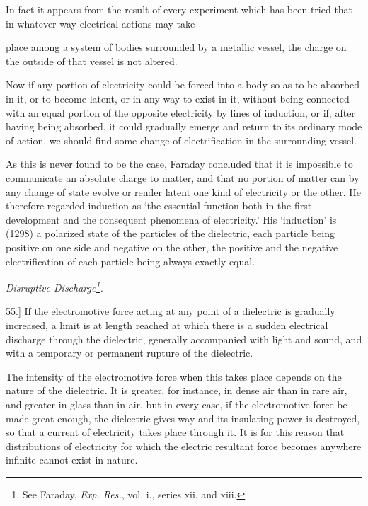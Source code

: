\documentclass[11pt,a4paper]{article}
\begin{document}
In fact it appears from the result of every experiment which
has been tried that in whatever way electrical actions may take

\clearpage
\setcounter{footnote}{0}

place among a system of bodies surrounded by a metallic vessel, the
charge on the outside of that vessel is not altered.

Now if any portion of electricity could be forced into a body
so as to be absorbed in it, or to become latent, or in any way
to exist in it, without being connected with an equal portion of
the opposite electricity by lines of induction, or if, after having
being absorbed, it could gradually emerge and return to its
ordinary mode of action, we should find some change of electrification
in the surrounding vessel.

As this is never found to be the case, Faraday concluded that
it is impossible to communicate an absolute charge to matter, and
that no portion of matter can by any change of state evolve or
render latent one kind of electricity or the other. He therefore
regarded induction as `the essential function both in the first
development and the consequent phenomena of electricity.' His
`induction' is (1298) a polarized state of the particles of the
dielectric, each particle being positive on one side and negative
on the other, the positive and the negative electrification of each
particle being always exactly equal.

\begin{center}
\textit{Disruptive Discharge\footnote{See Faraday, \textit{Exp. Res.}, vol. i.,
series xii. and xiii.}.}
\end{center}

55.] If the electromotive force acting at any point of a dielectric
is gradually increased, a limit is at length reached at which there
is a sudden electrical discharge through the dielectric, generally
accompanied with light and sound, and with a temporary or
permanent rupture of the dielectric.

The intensity of the electromotive force when this takes place
depends on the nature of the dielectric. It is greater, for instance,
in dense air than in rare air, and greater in glass than in air, but
in every case, if the electromotive force be made great enough,
the dielectric gives way and its insulating power is destroyed, so
that a current of electricity takes place through it. It is for this
reason that distributions of electricity for which the electric resultant
force becomes anywhere infinite cannot exist in nature.
\end{document}
